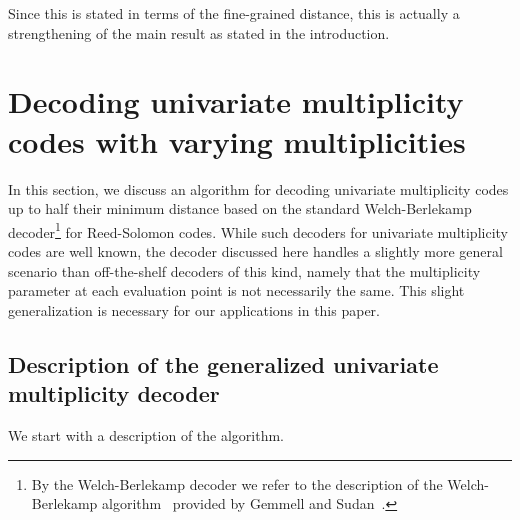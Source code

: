 \documentclass{theoretics}
\begin{document}
	Since this is stated in terms of the fine-grained distance, this is actually a strengthening of the main result as stated in the introduction.
	
	\section{Decoding univariate multiplicity codes with varying
		multiplicities}\label{sec:BWmultiplicity}
	In this section, we discuss an algorithm for decoding univariate
	multiplicity codes up to half their minimum distance based on the
	standard Welch-Berlekamp decoder\footnote{By the
		Welch-Berlekamp decoder we refer to the description of the Welch-Berlekamp algorithm~\cite{WelchB1986} provided by
		Gemmell and Sudan~\cite{GemmellS1992}.} for Reed-Solomon codes. While such
	decoders for univariate multiplicity codes are well known, the decoder
	discussed here handles a slightly more general scenario than
	off-the-shelf decoders of this kind, namely that the multiplicity
	parameter at each evaluation point is not necessarily the same. This
	slight generalization is necessary for our applications in this
	paper. %
	
	\subsection{Description of the generalized univariate multiplicity decoder}
	
	We start with a description of the algorithm.
\end{document}
